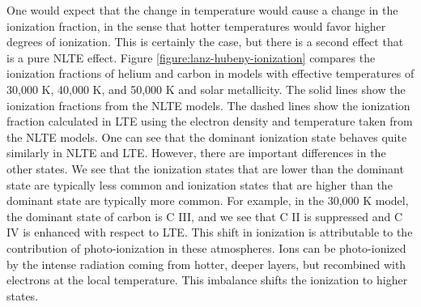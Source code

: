 One would expect that the change in temperature would cause a change in the ionization fraction, in the sense that hotter temperatures would favor higher degrees of ionization. This is certainly the case, but there is a second effect that is a pure NLTE effect. Figure \ref{figure:lanz-hubeny-ionization}
 compares the ionization fractions of helium and carbon in models with effective temperatures of 30,000 K, 40,000 K, and 50,000 K and solar metallicity. The solid lines show the ionization fractions from the NLTE models. The dashed lines show the ionization fraction calculated in LTE using the electron density and temperature taken from the NLTE models. One can see that the dominant ionization state behaves quite similarly in NLTE and LTE. However, there are important differences in the other states. We see that the ionization states that are lower than the dominant state are typically less common and ionization states that are higher than the dominant state are typically more common. For example, in the 30,000 K model, the dominant state of carbon is C III, and we see that C II is suppressed and C IV is enhanced with respect to LTE. This shift in ionization is attributable to the contribution of photo-ionization in these atmospheres. Ions can be photo-ionized by the intense radiation coming from hotter, deeper layers, but recombined with electrons at the local temperature. This imbalance shifts the ionization to higher states.


